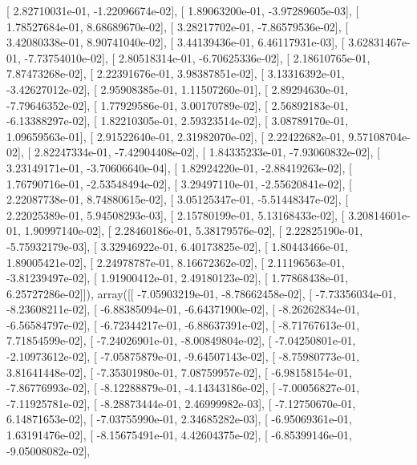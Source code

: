 \documentclass{article}
\begin{document}
       [  2.82710031e-01,  -1.22096674e-02],
       [  1.89063200e-01,  -3.97289605e-03],
       [  1.78527684e-01,   8.68689670e-02],
       [  3.28217702e-01,  -7.86579536e-02],
       [  3.42080338e-01,   8.90741040e-02],
       [  3.44139436e-01,   6.46117931e-03],
       [  3.62831467e-01,  -7.73754010e-02],
       [  2.80518314e-01,  -6.70625336e-02],
       [  2.18610765e-01,   7.87473268e-02],
       [  2.22391676e-01,   3.98387851e-02],
       [  3.13316392e-01,  -3.42627012e-02],
       [  2.95908385e-01,   1.11507260e-01],
       [  2.89294630e-01,  -7.79646352e-02],
       [  1.77929586e-01,   3.00170789e-02],
       [  2.56892183e-01,  -6.13388297e-02],
       [  1.82210305e-01,   2.59323514e-02],
       [  3.08789170e-01,   1.09659563e-01],
       [  2.91522640e-01,   2.31982070e-02],
       [  2.22422682e-01,   9.57108704e-02],
       [  2.82247334e-01,  -7.42904408e-02],
       [  1.84335233e-01,  -7.93060832e-02],
       [  3.23149171e-01,  -3.70606640e-04],
       [  1.82924220e-01,  -2.88419263e-02],
       [  1.76790716e-01,  -2.53548494e-02],
       [  3.29497110e-01,  -2.55620841e-02],
       [  2.22087738e-01,   8.74880615e-02],
       [  3.05125347e-01,  -5.51448347e-02],
       [  2.22025389e-01,   5.94508293e-03],
       [  2.15780199e-01,   5.13168433e-02],
       [  3.20814601e-01,   1.90997140e-02],
       [  2.28460186e-01,   5.38179576e-02],
       [  2.22825190e-01,  -5.75932179e-03],
       [  3.32946922e-01,   6.40173825e-02],
       [  1.80443466e-01,   1.89005421e-02],
       [  2.24978787e-01,   8.16672362e-02],
       [  2.11196563e-01,  -3.81239497e-02],
       [  1.91900412e-01,   2.49180123e-02],
       [  1.77868438e-01,   6.25727286e-02]]), array([[ -7.05903219e-01,  -8.78662458e-02],
       [ -7.73356034e-01,  -8.23608211e-02],
       [ -6.88385094e-01,  -6.64371900e-02],
       [ -8.26262834e-01,  -6.56584797e-02],
       [ -6.72344217e-01,  -6.88637391e-02],
       [ -8.71767613e-01,   7.71854599e-02],
       [ -7.24026901e-01,  -8.00849804e-02],
       [ -7.04250801e-01,  -2.10973612e-02],
       [ -7.05875879e-01,  -9.64507143e-02],
       [ -8.75980773e-01,   3.81641448e-02],
       [ -7.35301980e-01,   7.08759957e-02],
       [ -6.98158154e-01,  -7.86776993e-02],
       [ -8.12288879e-01,  -4.14343186e-02],
       [ -7.00056827e-01,  -7.11925781e-02],
       [ -8.28873444e-01,   2.46999982e-03],
       [ -7.12750670e-01,   6.14871653e-02],
       [ -7.03755990e-01,   2.34685282e-03],
       [ -6.95069361e-01,   1.63191476e-02],
       [ -8.15675491e-01,   4.42604375e-02],
       [ -6.85399146e-01,  -9.05008082e-02],
\end{document}
